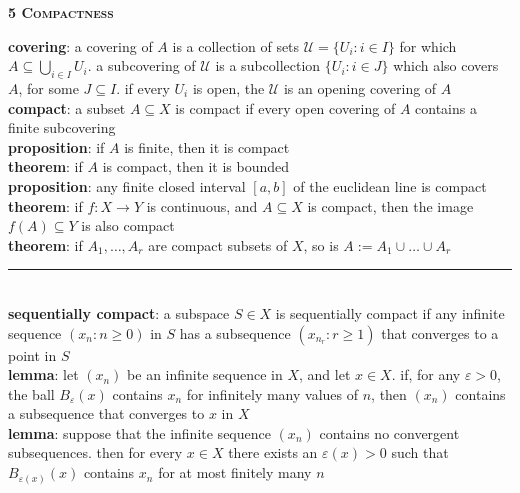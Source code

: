 \documentclass[a4paper]{article}
\newcommand*\linesep[0]{\noindent\rule{\textwidth}{0.5pt}\\}
\begin{document}
\begin{framed}
	\begin{center}
		\textbf{\textsc{5 Compactness}}
	\end{center}
	\textbf{covering}: a covering of $A$ is a collection of sets $\mathcal{U} = \{U_i : i \in I\}$ for which $A \subseteq \bigcup_{i \in I} U_i$. a subcovering of $\mathcal{U}$ is a subcollection $\{U_i : i \in J\}$ which also covers $A$, for some $J \subseteq I$. if every $U_i$ is open, the $\mathcal{U}$ is an opening covering of $A$\\
	
	\noindent
	\textbf{compact}: a subset $A \subseteq X$ is compact if every open covering of $A$ contains a finite subcovering\\
	
	\noindent
	\textbf{proposition}: if $A$ is finite, then it is compact\\
	
	\noindent
	\textbf{theorem}: if $A$ is compact, then it is bounded\\
	
	\noindent
	\textbf{proposition}: any finite closed interval $[a,b]$ of the euclidean line is compact\\
	
	\noindent
	\textbf{theorem}: if $f: X \rightarrow Y$ is continuous, and $A \subseteq X$ is compact, then the image $f(A) \subseteq Y$ is also compact\\
	
	\noindent
	\textbf{theorem}: if $A_1, \dots ,A_r$ are compact subsets of $X$, so is $A := A_1 \cup \dots \cup A_r$
	
	\linesep
	\textbf{sequentially compact}: a subspace $S \in X$ is sequentially compact if any infinite sequence $(x_n : n \geq 0)$ in $S$ has a subsequence $(x_{n_r} : r \geq 1)$ that converges to a point in $S$\\
	
	\noindent
	\textbf{lemma}: let $(x_n)$ be an infinite sequence in $X$, and let $x \in X$. if, for any $\varepsilon > 0$, the ball $B_\varepsilon(x)$ contains $x_n$ for infinitely many values of $n$, then $(x_n)$ contains a subsequence that converges to $x$ in $X$\\
	
	\noindent
	\textbf{lemma}: suppose that the infinite sequence $(x_n)$ contains no convergent subsequences. then for every $x \in X$ there exists an $\varepsilon(x) > 0$ such that $B_{\varepsilon(x)}(x)$ contains $x_n$ for at most finitely many $n$\\
	

\end{framed}
\end{document}
